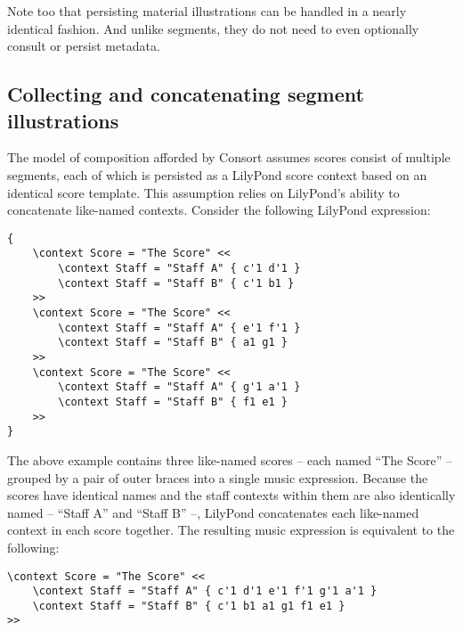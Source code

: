 Note too that persisting material illustrations can be handled in a nearly
identical fashion. And unlike segments, they do not need to even optionally
consult or persist metadata.

\subsection{Collecting and concatenating segment illustrations}
\label{ssec:collecting-and-concatenating-segment-illustrations}

The model of composition afforded by Consort assumes scores consist of multiple
segments, each of which is persisted as a LilyPond score context based on an
identical score template. This assumption relies on LilyPond's ability to
concatenate like-named contexts. Consider the following LilyPond expression:

\begin{singlespacing}
\vspace{-0.5\baselineskip}
\begin{verbatim}
{
    \context Score = "The Score" <<
        \context Staff = "Staff A" { c'1 d'1 }
        \context Staff = "Staff B" { c'1 b1 }
    >>
    \context Score = "The Score" <<
        \context Staff = "Staff A" { e'1 f'1 }
        \context Staff = "Staff B" { a1 g1 }
    >>
    \context Score = "The Score" <<
        \context Staff = "Staff A" { g'1 a'1 }
        \context Staff = "Staff B" { f1 e1 }
    >>
}
\end{verbatim}
\end{singlespacing}

\noindent The above example contains three like-named scores -- each named
\enquote{The Score} -- grouped by a pair of outer braces into a single music
expression. Because the scores have identical names and the staff contexts
within them are also identically named -- \enquote{Staff A} and \enquote{Staff
B} --, LilyPond concatenates each like-named
context in each score together. The resulting music expression is equivalent to
the following:

\begin{singlespacing}
\vspace{-0.5\baselineskip}
\begin{verbatim}
\context Score = "The Score" <<
    \context Staff = "Staff A" { c'1 d'1 e'1 f'1 g'1 a'1 }
    \context Staff = "Staff B" { c'1 b1 a1 g1 f1 e1 }
>>
\end{verbatim}
\end{singlespacing}

